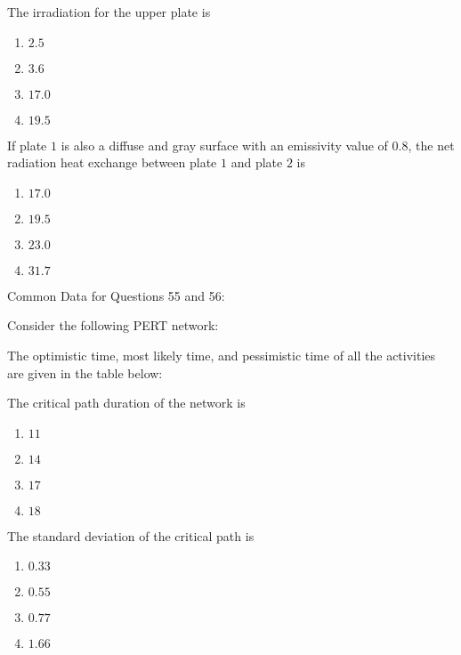 \item The irradiation  for the upper plate  is


    \begin{enumerate}
        \item $2.5$
        \item $3.6$
        \item $17.0$
        \item $19.5$
    \end{enumerate}

    \item If plate $1$ is also a diffuse and gray surface with an emissivity value of $0.8$, the net radiation heat exchange  between plate $1$ and plate $2$ is
    \begin{enumerate}
        \item $17.0$
        \item $19.5$
        \item $23.0$
        \item $31.7$
    \end{enumerate} 
 Common Data for Questions 55 and 56:
    
    Consider the following PERT network:
    
   

    The optimistic time, most likely time, and pessimistic time of all the activities are given in the table below:
    
    
    \item The critical path duration of the network  is
    \begin{enumerate}
        \item $11$
        \item $14$
        \item $17$
        \item $18$
    \end{enumerate}

    \item The standard deviation of the critical path is
    \begin{enumerate}
        \item $0.33$
        \item $0.55$
        \item $0.77$
        \item $1.66$
    \end{enumerate}


